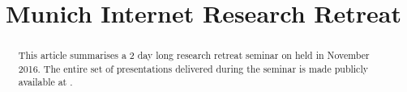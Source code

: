\documentclass{sigcomm-alternate}
\begin{document}
\title{Munich Internet Research Retreat}


\maketitle

\begin{abstract}

This article summarises a 2 day long research retreat seminar on  held in
November 2016.  The entire set of presentations delivered during the seminar
is made publicly available at \cite{mir-materials}.

\end{abstract}
\end{document}
